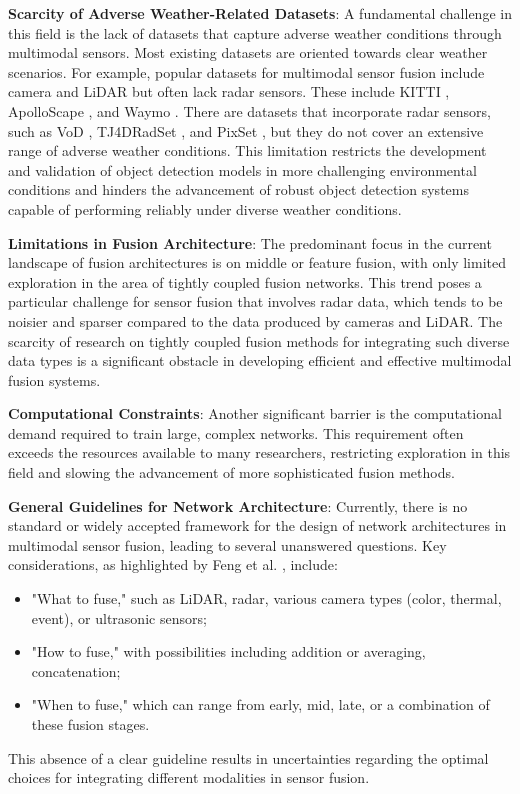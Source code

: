 \documentclass[report.tex]{subfiles}
\begin{document}
        \textbf{Scarcity of Adverse Weather-Related Datasets}: A fundamental challenge in this field is the lack of datasets that capture adverse weather conditions through multimodal sensors. Most existing datasets are oriented towards clear weather scenarios. For example, popular datasets for multimodal sensor fusion include camera and LiDAR but often lack radar sensors. These include KITTI \cite{geiger2012we}, ApolloScape \cite{huang2019apolloscape}, and Waymo \cite{sun2020scalability}. There are datasets that incorporate radar sensors, such as VoD \cite{palffy2022multi}, TJ4DRadSet \cite{zheng2022tj4dradset}, and PixSet \cite{deziel2021pixset}, but they do not cover an extensive range of adverse weather conditions. This limitation restricts the development and validation of object detection models in more challenging environmental conditions and hinders the advancement of robust object detection systems capable of performing reliably under diverse weather conditions.

        \textbf{Limitations in Fusion Architecture}: The predominant focus in the current landscape of fusion architectures is on middle or feature fusion, with only limited exploration in the area of tightly coupled fusion networks. This trend poses a particular challenge for sensor fusion that involves radar data, which tends to be noisier and sparser compared to the data produced by cameras and LiDAR. The scarcity of research on tightly coupled fusion methods for integrating such diverse data types is a significant obstacle in developing efficient and effective multimodal fusion systems.

        \textbf{Computational Constraints}: Another significant barrier is the computational demand required to train large, complex networks. This requirement often exceeds the resources available to many researchers, restricting exploration in this field and slowing the advancement of more sophisticated fusion methods.

        \textbf{General Guidelines for Network Architecture}: Currently, there is no standard or widely accepted framework for the design of network architectures in multimodal sensor fusion, leading to several unanswered questions. Key considerations, as highlighted by Feng et al. \cite{feng2020deep}, include:
        \begin{itemize}
            \item "What to fuse," such as LiDAR, radar, various camera types (color, thermal, event), or ultrasonic sensors;
            \item "How to fuse," with possibilities including addition or averaging, concatenation;
            \item "When to fuse," which can range from early, mid, late, or a combination of these fusion stages.
        \end{itemize}
        This absence of a clear guideline results in uncertainties regarding the optimal choices for integrating different modalities in sensor fusion.
\end{document}
